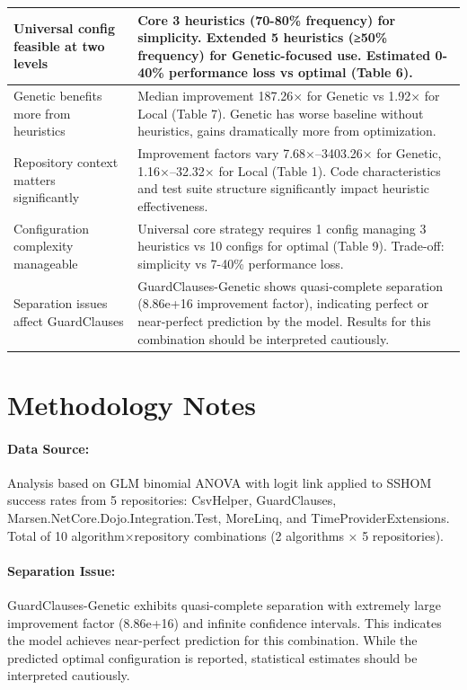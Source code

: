 \documentclass{article}
\begin{document}
\begin{longtable}{@{}p{}p{}@{}}
Universal config feasible at two levels & 
Core 3 heuristics (70-80\% frequency) for simplicity. Extended 5 heuristics (≥50\% frequency) for Genetic-focused use. Estimated 0-40\% performance loss vs optimal (Table 6). \\
\midrule

Genetic benefits more from heuristics & 
Median improvement 187.26× for Genetic vs 1.92× for Local (Table 7). Genetic has worse baseline without heuristics, gains dramatically more from optimization. \\
\midrule

Repository context matters significantly & 
Improvement factors vary 7.68×--3403.26× for Genetic, 1.16×--32.32× for Local (Table 1). Code characteristics and test suite structure significantly impact heuristic effectiveness. \\
\midrule

Configuration complexity manageable & 
Universal core strategy requires 1 config managing 3 heuristics vs 10 configs for optimal (Table 9). Trade-off: simplicity vs 7-40\% performance loss. \\
\midrule

Separation issues affect GuardClauses & 
GuardClauses-Genetic shows quasi-complete separation (8.86e+16 improvement factor), indicating perfect or near-perfect prediction by the model. Results for this combination should be interpreted cautiously. \\

\end{longtable}


\section*{Methodology Notes}

\paragraph{Data Source:} Analysis based on GLM binomial ANOVA with logit link applied to SSHOM success rates from 5 repositories: CsvHelper, GuardClauses, Marsen.NetCore.Dojo.Integration.Test, MoreLinq, and TimeProviderExtensions. Total of 10 algorithm×repository combinations (2 algorithms × 5 repositories).

\paragraph{Separation Issue:} GuardClauses-Genetic exhibits quasi-complete separation with extremely large improvement factor (8.86e+16) and infinite confidence intervals. This indicates the model achieves near-perfect prediction for this combination. While the predicted optimal configuration is reported, statistical estimates should be interpreted cautiously.
\end{document}

